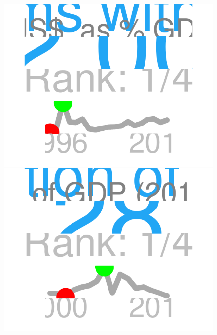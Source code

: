 \documentclass{article}\usepackage[]{graphicx}\usepackage[]{color}
\makeatletter
\def\maxwidth{ %
  \ifdim\Gin@nat@width>\linewidth
    \linewidth
  \else
    \Gin@nat@width
  \fi
}
\makeatother
\begin{document}
\begin{figure}
\begin{minipage}[c]{0.95\textwidth}
\begin{minipage}[c]{0.95\textwidth}
\begin{minipage}[c]{0.33\textwidth}
{\centering \includegraphics[width=\maxwidth]{figure/figure_sparkline_Fin2-1} 

}



      \end{minipage}
      \begin{minipage}[c]{0.33\textwidth}


{\centering \includegraphics[width=\maxwidth]{figure/figure_sparkline_Fin3-1} 

}



      \end{minipage}
  \end{minipage}
    

\end{minipage}
\end{figure}
\end{document}

